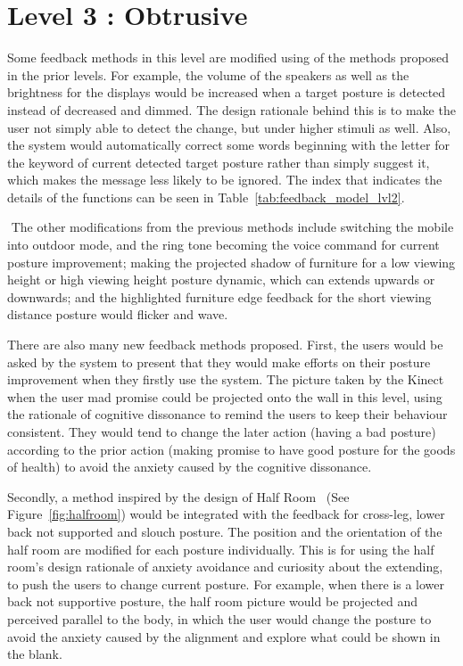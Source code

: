 \section{Level 3 : Obtrusive}
Some feedback methods in this level are modified using of the methods proposed in the prior levels. For example, the volume of the speakers as well as the brightness for the displays would be increased when a target posture is detected instead of decreased and dimmed. The design rationale behind this is to make the user not simply able to detect the change, but under higher stimuli as well. Also, the system would automatically correct some words beginning with the letter for the keyword of current detected target posture rather than simply suggest it, which makes the message less likely to be ignored. The index that indicates the details of the functions can be seen in Table~\ref{tab:feedback_model_lvl2}.

 The other modifications from the previous methods include switching the mobile into outdoor mode, and the ring tone becoming the voice command for current posture improvement; making the projected shadow of furniture for a low viewing height or high viewing height posture dynamic, which can extends upwards or downwards; and the highlighted furniture edge feedback for the short viewing distance posture would flicker and wave.

There are also many new feedback methods proposed. First, the users would be asked by the system to present that they would make efforts on their posture improvement when they firstly use the system. The picture taken by the Kinect when the user mad promise could be projected onto the wall in this level, using the rationale of cognitive dissonance to remind the users to keep their behaviour consistent. They would tend to change the later action (having a bad posture) according to the prior action (making promise to have good posture for the goods of health) to avoid the anxiety caused by the cognitive dissonance. 

Secondly, a method inspired by the design of Half Room~\cite{half_room} (See Figure~\ref{fig:halfroom}) would be integrated with the feedback for cross-leg, lower back not supported and slouch posture. The position and the orientation of the half room are modified for each posture individually. This is for using the half room’s design rationale of anxiety avoidance and curiosity about the extending, to push the users to change current posture. For example, when there is a lower back not supportive posture, the half room picture would be projected and perceived parallel to the body, in which the user would change the posture to avoid the anxiety caused by the alignment and explore what could be shown in the blank.

